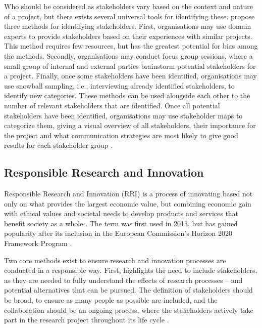 Who should be considered as stakeholders vary based on the context and nature of a project, but there exists several universal tools for identifying these. \textcite{Reed_2009_stakeholders} propose three methods for identifying stakeholders. First, organisations may use domain experts to provide stakeholders based on their experiences with similar projects. This method requires few resources, but has the greatest potential for bias among the methods. Secondly, organisations may conduct focus group sessions, where a small group of internal and external parties brainstorm potential stakeholders for a project. Finally, once some stakeholders have been identified, organisations may use snowball sampling, i.e., interviewing already identified stakeholders, to identify new categories. These methods can be used alongside each other to the number of relevant stakeholders that are identified. Once all potential stakeholders have been identified, organisations may use stakeholder maps to categorize them, giving a visual overview of all stakeholders, their importance for the project and what communication strategies are most likely to give good results for each stakeholder group \parencite{Hoory_2022_stakeholders}.


\subsection{Responsible Research and Innovation}
Responsible Research and Innovation (RRI) is a process of innovating based not only on what provides the largest economic value, but combining economic gain with ethical values and societal needs to develop products and services that benefit society as a whole \parencite{Werker_2020_RRI}. The term was first used in 2013, but has gained popularity after its inclusion in the European Commission's Horizon 2020 Framework Program \parencite{Burget_2017_RRI}.

Two core methods exist to ensure research and innovation processes are conducted in a responsible way. First, \textcite{Werker_2020_RRI} highlights the need to include stakeholders, as they are needed to fully understand the effects of research processes -- and potential alternatives that can be pursued. The definition of stakeholders should be broad, to ensure as many people as possible are included, and the collaboration should be an ongoing process, where the stakeholders actively take part in the research project throughout its life cycle \parencite{Schomberg_2013_RRI}.

